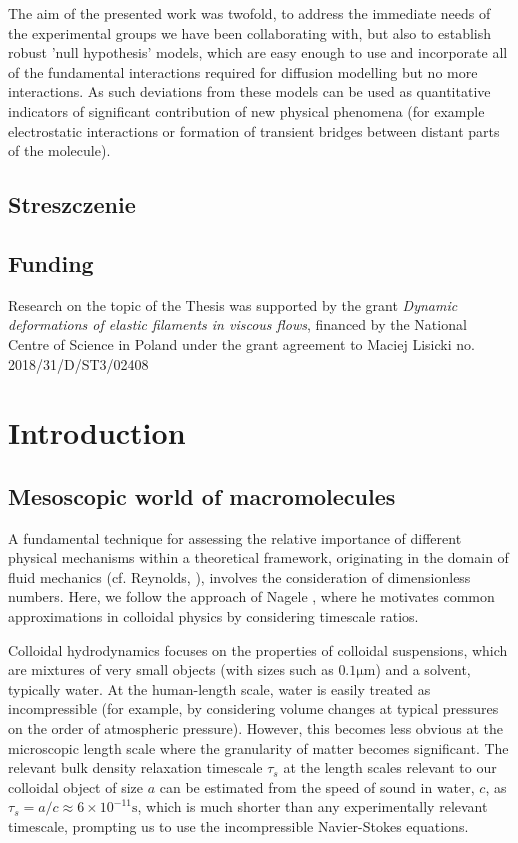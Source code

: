 \documentclass{doctoral}
\begin{document}
The aim of the presented work was twofold, to address the immediate needs of the experimental groups we have been collaborating with, but also to establish robust 'null hypothesis' models, which are easy enough to use and incorporate all of the fundamental interactions required for diffusion modelling but no more interactions.
As such deviations from these models can be used as quantitative indicators of significant contribution of new physical phenomena (for example electrostatic interactions or formation of transient bridges between distant parts of the molecule).
\clearpage

\section*{Streszczenie}

\clearpage

\section*{Funding}
Research on the topic of the Thesis was supported by the grant \emph{Dynamic deformations of elastic filaments in viscous flows}, financed by the National Centre of Science in Poland under the grant agreement to Maciej Lisicki no.
2018/31/D/ST3/02408
\clearpage

\tableofcontents

\chapter{Introduction}

\section{Mesoscopic world of macromolecules}

A fundamental technique for assessing the relative importance of different physical mechanisms within a theoretical framework, originating in the domain of fluid mechanics (cf.
Reynolds, \cite{Reynolds_1883}), involves the consideration of dimensionless numbers.
Here, we follow the approach of Nagele \cite{Nagele_2013}, where he motivates common approximations in colloidal physics by considering timescale ratios.

Colloidal hydrodynamics focuses on the properties of colloidal suspensions, which are mixtures of very small objects (with sizes such as $0.1 \mathrm{\mu m}$) and a solvent, typically water.
At the human-length scale, water is easily treated as incompressible (for example, by considering volume changes at typical pressures on the order of atmospheric pressure).
However, this becomes less obvious at the microscopic length scale where the granularity of matter becomes significant.
The relevant bulk density relaxation timescale $\tau_s$ at the length scales relevant to our colloidal object of size $a$ can be estimated from the speed of sound in water, $c$, as $\tau_s = a/c \approx 6 \times 10^{-11} \mathrm{s}$, which is much shorter than any experimentally relevant timescale, prompting us to use the incompressible Navier-Stokes equations.
\end{document}
